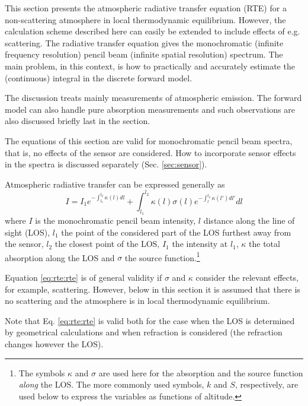 %
%
This section presents the atmospheric radiative transfer equation
(RTE) for a non-scattering atmosphere in local thermodynamic
equilibrium.  However, the calculation scheme described here can
easily be extended to include effects of e.g. scattering. The
radiative transfer equation gives the monochromatic (infinite
frequency resolution) pencil beam (infinite spatial resolution)
spectrum. The main problem, in this context, is how to practically and
accurately estimate the (continuous) integral in the discrete forward
model.
 
The discussion treats mainly measurements of atmospheric emission. The 
forward model can also handle pure absorption measurements and such 
observations are also discussed briefly last in the section.

The equations of this section are valid for monochromatic pencil beam
spectra, that is, no effects of the sensor are considered. How to
incorporate sensor effects in the spectra is discussed separately
(Sec. \ref{sec:sensor}).



 \label{sec:rte:intro}
 
 Atmospheric radiative transfer can be expressed generally as
 \begin{equation}
   I = I_1e^{-\int_{l_1}^{l_2}{\kappa(l)dl}} +
        \int_{l_1}^{l_2}{\kappa(l)\sigma(l)e^{-\int_{l}^{l_2}{\kappa(l')dl'}}dl}
    \label{eq:rte:rte}
 \end{equation}
 where $I$ is the monochromatic pencil beam intensity, $l$ distance
 along the line of sight (LOS), $l_1$ the point of the considered part
 of the LOS furthest away from the sensor, $l_2$ the closest point of
 the LOS, $I_1$ the intensity at $l_1$, $\kappa$ the total absorption
 along the LOS and $\sigma$ the source function.\footnote{The symbols
   $\kappa$ and $\sigma$ are used here for the absorption and the source 
   function \emph{along} the LOS. The more commonly used symbols, $k$ and
   $S$, respectively, are used below to express the variables as
   functions of altitude.}
  
 Equation \ref{eq:rte:rte} is of general validity if $\sigma$ and $\kappa$
 consider the relevant effects, for example, scattering. However, below in
 this section it is assumed that there is no scattering and the
 atmosphere is in local thermodynamic equilibrium.
  
 Note that Eq. \ref{eq:rte:rte} is valid both for the case when the LOS is
 determined by geometrical calculations and when refraction is
 considered (the refraction changes however the LOS).
  
